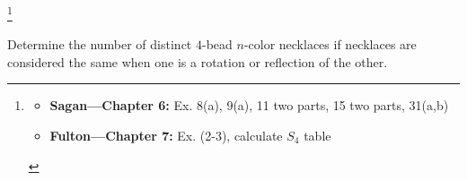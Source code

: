 \documentclass[addpoints,10pt]{exam}
\theoremstyle{plain}
\theoremstyle{definition}
\newtheorem{prob}[thm]{Problem}
\theoremstyle{plain}
\theoremstyle{plain}
\theoremstyle{definition}
\let\oldprob\prob
\let\endoldprob\endprob
\renewenvironment{prob}
  {\begin{singlespace}\oldprob}
  {\endoldprob\end{singlespace}}
\begin{document}
\renewcommand{\thefootnote}{}
\footnote{%
  \parbox[t]{0.95\linewidth}{%
    \begin{itemize}[leftmargin=*,nosep]
      \item \textbf{Sagan---Chapter 6:} Ex. 8(a), 9(a), 11 two parts, 15 two parts, 31(a,b)
      \item \textbf{Fulton---Chapter 7:} Ex. (2-3), calculate $S_{4}$ table
    \end{itemize}%
  }%
}
\setcounter{thm}{7}
\renewcommand{\thethm}{\arabic{thm}(a)}
\begin{prob}
Determine the number of distinct $4$-bead $n$-color necklaces if necklaces are considered the same when one is a rotation or reflection of the other.
\end{prob}
\end{document}
